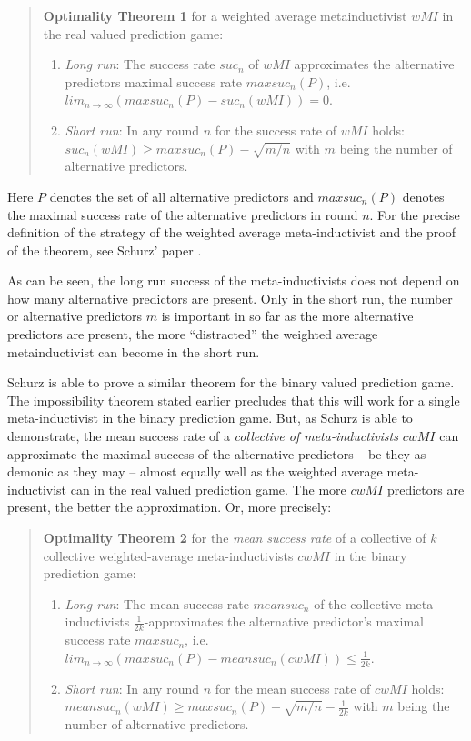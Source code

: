 \documentclass[12pt, a4paper]{article}
\numberwithin{equation}{section}
\begin{document}
\begin{quote}
{\bf Optimality Theorem 1} for a weighted average
metainductivist $wMI$ in the real valued prediction game:
\begin{enumerate}
  \item {\em Long run}: The success rate $suc_n$ of $wMI$ approximates the
  alternative predictors maximal success rate $maxsuc_n(P)$, i.e.
  $lim_{n\rightarrow\infty} (maxsuc_n(P) - suc_n(wMI)) = 0$.
  \item {\em Short run}: In any round $n$ for the success rate of $wMI$ holds:
  $suc_n(wMI) \geq maxsuc_n(P) - \sqrt{m/n}$ with $m$ being the number of
  alternative predictors.
\end{enumerate}
\end{quote}

Here $P$ denotes the set of all alternative predictors and $maxsuc_n(P)$ denotes
the maximal success rate of the alternative predictors in round $n$. For the
precise definition of the strategy of the weighted average meta-inductivist and
the proof of the theorem, see Schurz' paper \cite[p. 296ff.]{schurz:2008}.

As can be seen, the long run success of the meta-inductivists does not
depend on how many alternative predictors are present. Only in the short
run, the number or alternative predictors $m$ is important in so far as
the more alternative predictors are present, the more ``distracted'' the
weighted average metainductivist can become in the short run.

Schurz is able to prove a similar theorem for
 the binary valued prediction game. The
impossibility theorem stated earlier precludes that this will work for a single
meta-inductivist in the binary prediction game. But, as Schurz is able to
demonstrate, the mean success rate of a {\em collective of meta-inductivists}
$cwMI$ can approximate the maximal success of the alternative predictors -- be
they as demonic as they may -- almost equally well as the weighted average
meta-inductivist can in the real valued prediction game. The more $cwMI$
predictors are present, the better the approximation. Or, more
precisely:

\begin{quote}
{\bf Optimality Theorem 2} for the {\em mean success rate} of a collective of
$k$ collective weighted-average meta-inductivists $cwMI$ in the binary
prediction game:
\begin{enumerate}
  \item {\em Long run}: The mean success rate $meansuc_n$ of the
  collective meta-inductivists $\frac{1}{2k}$-approximates the alternative
  predictor's maximal
  success rate $maxsuc_n$, i.e. $lim_{n\rightarrow\infty} (maxsuc_n(P) -
  meansuc_n(cwMI)) \leq \frac{1}{2k}$.
  \item {\em Short run}: In any round $n$ for the mean success rate of $cwMI$
  holds: $meansuc_n(wMI) \geq maxsuc_n(P) - \sqrt{m/n} - \frac{1}{2k}$ with $m$
  being the number of alternative predictors.
\end{enumerate}
\end{quote}
\end{document}
